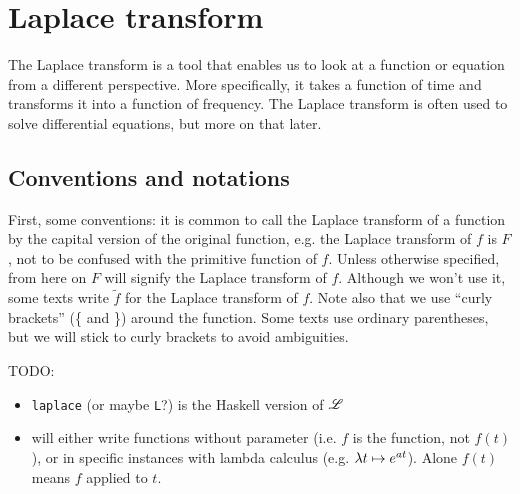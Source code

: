 
\section{Laplace transform}
The Laplace transform is a tool that enables us to look at a function or equation from a different perspective. More specifically, it takes a function of time and transforms it into a function of frequency.
The Laplace transform is often used to solve differential equations, but more on that later. 

\subsection{Conventions and notations} 
First, some conventions: it is common to call the Laplace transform of a function by the capital version of the original function, e.g. the Laplace transform of $f$ is $F$, not to be confused with the primitive function of $f$. Unless otherwise specified, from here on $F$ will signify the Laplace transform of $f$. Although we won't use it, some texts write $\widetilde{f}$ for the Laplace transform of $f$.  Note also that we use ``curly brackets'' (\{ and \}) around the function. Some texts use ordinary parentheses, but we will stick to curly brackets to avoid ambiguities. 

TODO: 
\begin{itemize}
    \item \verb|laplace| (or maybe \verb|L|?) is the Haskell version of $\mathscr{L}$
    \item will either write functions without parameter (i.e. $f$ is the function, not $f(t)$), or in specific instances with lambda calculus (e.g. $\lambda t \mapsto e^{at}$).  Alone $f(t)$ means $f$ applied to $t$. 
\end{itemize}

